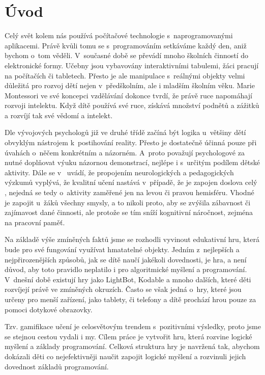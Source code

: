 \chapter{Úvod}

Celý svět kolem nás používá počítačové technologie s~naprogramovanými aplikacemi. Právě kvůli tomu se s~programováním setkáváme každý den, aniž bychom o~tom věděli. V~současné době se převádí mnoho školních činností do elektronické formy. Učebny jsou vybavovány interaktivními tabulemi, žáci pracují na počítačích či tabletech. Přesto je ale manipulace s~reálnými objekty velmi důležitá pro rozvoj dětí nejen v~předškolním, ale i mladším školním věku. Marie Montessori ve své koncepci vzdělávání dokonce tvrdí, že právě ruce napomáhají rozvoji intelektu. Když dítě používá své ruce, získává množství podnětů a zážitků a rozvíjí tak své vědomí a intelekt. \cite{Montessori}
\par
Dle vývojových psychologů \cite{VyvojovaPsychologie} již ve druhé třídě začíná být logika u~většiny dětí obvyklým nástrojem k~postihování reality. Přesto je dostatečně účinná pouze při úvahách o~něčem konkrétním a názorném. A~proto považují psychologové za nutné doplňovat výuku názornou demonstrací, nejlépe i s~určitým podílem dětské aktivity. Dále se v~\cite{ASE} uvádí, že propojením neurologických a pedagogických výzkumů vyplývá, že kvalitní učení nastává v~případě, že je zapojen doslova celý  , nejedná se tedy o~aktivity zaměřené jen na levou či pravou hemisféru. Vhodné je zapojit u~žáků všechny smysly, a to nikoli proto, aby se zvýšila zábavnost či zajímavost dané činnosti, ale protože se tím sníží kognitivní náročnost, zejména na pracovní paměť.
\par
Na základě výše zmíněných faktů jsme se rozhodli vyvinout edukativní hru, která bude pro své fungování využívat hmatatelné objekty. Jedním z~nejlepších a nejpřirozenějších způsobů, jak se dítě naučí jakékoli dovednosti, je hra, a není důvod, aby toto pravidlo neplatilo i pro algoritmické myšlení a programování. V~dnešní době existují hry jako LightBot, Kodable a mnoho dalších, které děti rozvíjejí právě ve zmíněných okruzích. Často se však jedná o~hry, které jsou určeny pro menší zařízení, jako tablety, či telefony a dítě prochází hrou pouze za pomoci dotykové obrazovky.
\par
Tzv. gamifikace učení je celosvětovým trendem s~pozitivními výsledky, proto jsme se stejnou cestou vydali i my. Cílem práce je vytvořit hru, která rozvine logické myšlení a základy programování. Celková struktura hry je navržená tak, abychom dokázali děti co nejefektivněji naučit zapojit logické myšlení a rozvinuli jejich dovednost základů programování.